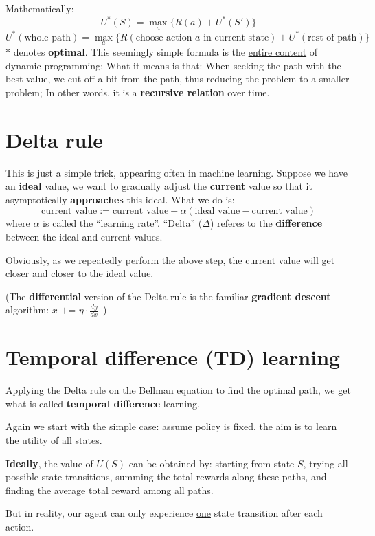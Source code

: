 \documentclass[orivec]{llncs}
\newcommand{\emp}[1]{\textbf{#1}}
\begin{document}
Mathematically:
$$ U^*(S) = \max_a \{ R(a) + U^*(S') \} $$
$$ U^*(\mbox{whole path}) = \max_a \{ R(\mbox{choose action $a$ in current state}) + U^*(\mbox{rest of path}) \} $$
$*$ denotes \emp{optimal}. This seemingly simple formula is the \uline{entire content} of dynamic programming;  What it means is that:  When seeking the path with the best value, we cut off a bit from the path, thus reducing the problem to a smaller problem;  In other words, it is a \textbf{recursive relation} over time.

\section{Delta rule}

This is just a simple trick, appearing often in machine learning.  Suppose we have an \textbf{ideal} value, we want to gradually adjust the \textbf{current} value so that it asymptotically \textbf{approaches} this ideal.  What we do is:
$$ \mbox{current value} := \mbox{current value} + \alpha ( \mbox{ideal value} - \mbox{current value}) $$
where $\alpha$ is called the ``learning rate''.  ``Delta'' ($\Delta$) referes to the \textbf{difference} between the ideal and current values.

Obviously, as we repeatedly perform the above step, the current value will get closer and closer to the ideal value.

(The \textbf{differential} version of the Delta rule is the familiar \textbf{gradient descent} algorithm:  $x \mbox{ += } \eta \cdot \frac{dy}{dx} \,$ )

\section{Temporal difference (TD) learning}

Applying the Delta rule on the Bellman equation to find the optimal path, we get what is called \textbf{temporal difference} learning.

Again we start with the simple case:  assume policy is fixed, the aim is to learn the utility of all states.

\textbf{Ideally}, the value of $U(S)$ can be obtained by:  starting from state $S$, trying all possible state transitions, summing the total rewards along these paths, and finding the average total reward among all paths.

But in reality, our agent can only experience \uline{one} state transition after each action.
\end{document}
